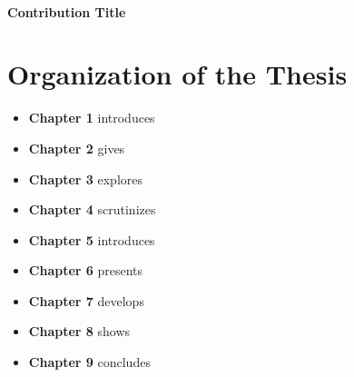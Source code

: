 \paragraph{Contribution Title}
\lipsum[1]

\section{Organization of the Thesis}

\begin{itemize}
\item \textbf{Chapter 1} introduces

\item \textbf{Chapter 2} gives

\item \textbf{Chapter 3} explores 

\item \textbf{Chapter 4} scrutinizes 

\item \textbf{Chapter 5} introduces

\item \textbf{Chapter 6} presents 

\item \textbf{Chapter 7} develops 

\item \textbf{Chapter 8} shows 

\item \textbf{Chapter 9} concludes 
\end{itemize}
